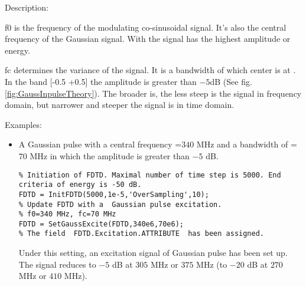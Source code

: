 \begin{FontDescr}{Description:}
    \begin{FontPara}{f0}  \label{para:f0}
     is the frequency of the modulating co-sinusoidal signal. It's also the central frequency of the Gaussian signal. With  the signal has the highest amplitude or energy.
    \end{FontPara}
    \begin{FontPara}{fc}  \label{para:fc}
		 determines the variance of the signal. It is a  bandwidth of which center is at . In the band [-0.5 \quad {}+0.5] the amplitude  is greater than  $-5$dB (See fig. \ref{fig:GaussInpulseTheory}).
The broader  is, the less steep is the signal in frequency domain, but narrower  and steeper the signal is in time domain.
    \end{FontPara} 
\end{FontDescr}


\begin{FontDescr}{Examples:}
 \begin{itemize}
\item A Gaussian pulse with a central frequency =$340$ MHz and a  bandwidth of =$70$ MHz in which the amplitude is greater than $-5$ dB.
\begin{lstlisting}
% Initiation of FDTD. Maximal number of time step is 5000. End criteria of energy is -50 dB.
FDTD = InitFDTD(5000,1e-5,'OverSampling',10);
% Update FDTD with a  Gaussian pulse excitation.
% f0=340 MHz, fc=70 MHz
FDTD = SetGaussExcite(FDTD,340e6,70e6);
% The field  FDTD.Excitation.ATTRIBUTE  has been assigned.
\end{lstlisting}
Under this setting, an excitation signal of Gaussian pulse has been set up. The signal reduces to $-5$ dB at $305$ MHz or $375$ MHz (to $-20$ dB at $270$ MHz or $410$ MHz).
\end{itemize}
\end{FontDescr}

